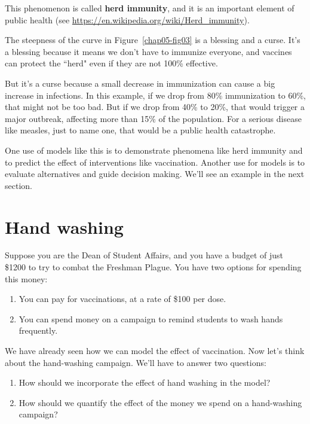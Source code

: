 \documentclass[12pt]{book}
\theoremstyle{exercise}
\begin{document}
This phenomenon is called {\bf herd immunity}, and it is an important element of public health (see \url{https://en.wikipedia.org/wiki/Herd_immunity}).

The steepness of the curve in Figure~\ref{chap05-fig03} is a blessing and a curse.  It's a blessing because it means we don't have to immunize everyone, and vaccines can protect the ``herd" even if they are not 100\% effective.

But it's a curse because a small decrease in immunization can cause a big increase in infections.  In this example, if we drop from 80\% immunization to 60\%, that might not be too bad.  But if we drop from 40\% to 20\%, that would trigger a major outbreak, affecting more than 15\% of the population.  For a serious disease like measles, just to name one, that would be a public health catastrophe.

One use of models like this is to demonstrate phenomena like herd immunity and to predict the effect of interventions like vaccination.  Another use for models is to evaluate alternatives and guide decision making.  We'll see an example in the next section.


\section{Hand washing}

Suppose you are the Dean of Student Affairs, and you have a budget of just \$1200 to try to combat the Freshman Plague.  You have two options for spending this money:

\begin{enumerate}

\item You can pay for vaccinations, at a rate of \$100 per dose.

\item You can spend money on a campaign to remind students to wash hands frequently.

\end{enumerate}

We have already seen how we can model the effect of vaccination.  Now let's think about the hand-washing campaign.  We'll have to answer two questions:

\begin{enumerate}

\item How should we incorporate the effect of hand washing in the model?

\item How should we quantify the effect of the money we spend on a hand-washing campaign?

\end{enumerate}
\end{document}
